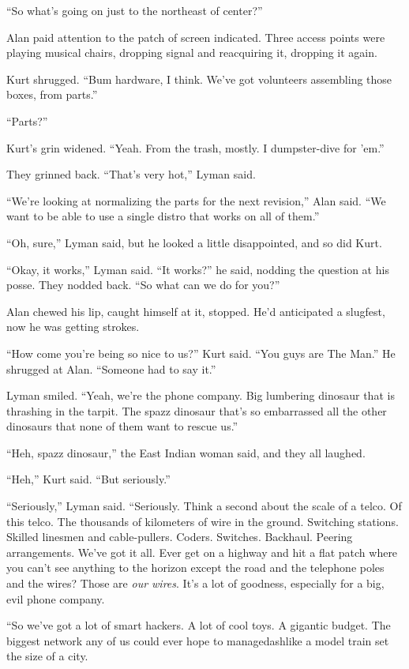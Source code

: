 ``So what's going on just to the northeast of center?''

Alan paid attention to the patch of screen indicated.  Three access
points were playing musical chairs, dropping signal and reacquiring
it, dropping it again.

Kurt shrugged.  ``Bum hardware, I think.  We've got volunteers
assembling those boxes, from parts.''

``Parts?''

Kurt's grin widened.  ``Yeah.  From the trash, mostly.  I
dumpster-dive for 'em.''

They grinned back.  ``That's very hot,'' Lyman said.

``We're looking at normalizing the parts for the next revision,'' Alan
said.  ``We want to be able to use a single distro that works on all
of them.''

``Oh, sure,'' Lyman said, but he looked a little disappointed, and so
did Kurt.

``Okay, it works,'' Lyman said.  ``It works?'' he said, nodding the
question at his posse.  They nodded back.  ``So what can we do for
you?''

Alan chewed his lip, caught himself at it, stopped.  He'd anticipated
a slugfest, now he was getting strokes.

``How come you're being so nice to us?'' Kurt said.  ``You guys are
The Man.'' He shrugged at Alan.  ``Someone had to say it.''

Lyman smiled.  ``Yeah, we're the phone company.  Big lumbering
dinosaur that is thrashing in the tarpit.  The spazz dinosaur that's
so embarrassed all the other dinosaurs that none of them want to
rescue us.''

``Heh, spazz dinosaur,'' the East Indian woman said, and they all
laughed.

``Heh,'' Kurt said.  ``But seriously.''

``Seriously,'' Lyman said.  ``Seriously.  Think a second about the
scale of a telco.  Of this telco.  The thousands of kilometers of wire
in the ground.  Switching stations.  Skilled linesmen and
cable-pullers.  Coders.  Switches.  Backhaul.  Peering arrangements. 
We've got it all.  Ever get on a highway and hit a flat patch where
you can't see anything to the horizon except the road and the
telephone poles and the wires?  Those are \textit{our wires}.  It's a
lot of goodness, especially for a big, evil phone company.

``So we've got a lot of smart hackers.  A lot of cool toys.  A
gigantic budget.  The biggest network any of us could ever hope to
managedash{}like a model train set the size of a city.

